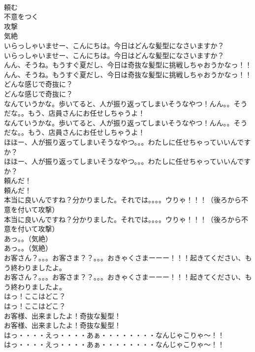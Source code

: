 \documentclass[8pt]{extreport}
\begin{document}
\begin{CJK}{UTF8}{min}
\\	頼む
\\	不意をつく
\\	攻撃
\\	気絶
\\	いらっしゃいませー、こんにちは。今日はどんな髪型になさいますか？	
\\	いらっしゃいませー、こんにちは。今日はどんな髪型になさいますか？ 
\\	んん、そうね。もうすぐ夏だし、今日は奇抜な髪型に挑戦しちゃおうかなっ！！	
\\	んん、そうね。もうすぐ夏だし、今日は奇抜な髪型に挑戦しちゃおうかなっ！！ 
\\	どんな感じで奇抜に？	
\\	どんな感じで奇抜に？ 
\\	なんていうかな。歩いてると、人が振り返ってしまいそうなやつ！んん。。そうだな。。もう、店員さんにお任せしちゃうよ！	
\\	なんていうかな。歩いてると、人が振り返ってしまいそうなやつ！んん。。そうだな。。もう、店員さんにお任せしちゃうよ！ 
\\	ほほー、人が振り返ってしまいそうなやつ。。。わたしに任せちゃっていいんですか？	
\\	ほほー、人が振り返ってしまいそうなやつ。。。わたしに任せちゃっていいんですか？ 
\\	頼んだ！	
\\	頼んだ！ 
\\	本当に良いんですね？分かりました。それでは。。。。ウりゃ！！！（後ろから不意を付いて攻撃）	
\\	本当に良いんですね？分かりました。それでは。。。。ウりゃ！！！（後ろから不意を付いて攻撃） 
\\	あっ。。（気絶）	
\\	あっ。。（気絶） 
\\	お客さん？。。。お客さま？？。。。おきゃくさまーーー！！！起きてください、もう終わりましたよ。	
\\	お客さん？。。。お客さま？？。。。おきゃくさまーーー！！！起きてください、もう終わりましたよ。 
\\	はっ！ここはどこ？	
\\	はっ！ここはどこ？ 
\\	お客様、出来ましたよ！奇抜な髪型！	
\\	お客様、出来ましたよ！奇抜な髪型！ 
\\	はっ・・・・えっ・・・・あぁ・・・・・・・・なんじゃこりゃ～！！	
\\	はっ・・・・えっ・・・・あぁ・・・・・・・・なんじゃこりゃ～！！ 

\end{CJK}
\end{document}
